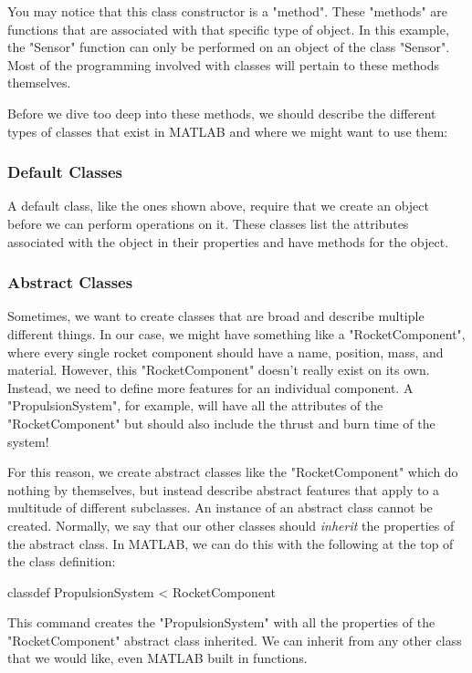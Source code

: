 \documentclass[10pt, openany, titlepage]{book}
\theoremstyle{definition}
\newcounter{example}[chapter]
\begin{document}
You may notice that this class constructor is a "method". These "methods"  are functions that are associated with that specific type of object. In this example, the "Sensor" function can only be performed on an object of the class "Sensor". Most of the programming involved with classes will pertain to these methods themselves.

Before we dive too deep into these methods, we should describe the different types of classes that exist in MATLAB and where we might want to use them:

\subsubsection{Default Classes}
A default class, like the ones shown above, require that we create an object before we can perform operations on it. These classes list the attributes associated with the object in their properties and have methods for the object.

\subsubsection{Abstract Classes}
Sometimes, we want to create classes that are broad and describe multiple different things. In our case, we might have something like a "RocketComponent", where every single rocket component should have a name, position, mass, and material. However, this "RocketComponent" doesn't really exist on its own. Instead, we need to define more features for an individual component. A "PropulsionSystem", for example, will have all the attributes of the "RocketComponent" but should also include the thrust and burn time of the system!

For this reason, we create abstract classes like the "RocketComponent" which do nothing by themselves, but instead describe abstract features that apply to a multitude of different subclasses. An instance of an abstract class cannot be created. Normally, we say that our other classes should \textit{inherit} the properties of the abstract class. In MATLAB, we can do this with the following at the top of the class definition:
\begin{matlabscript}{}
classdef PropulsionSystem < RocketComponent
\end{matlabscript}

This command creates the "PropulsionSystem" with all the properties of the "RocketComponent" abstract class inherited. We can inherit from any other class that we would like, even MATLAB built in functions.
\end{document}
